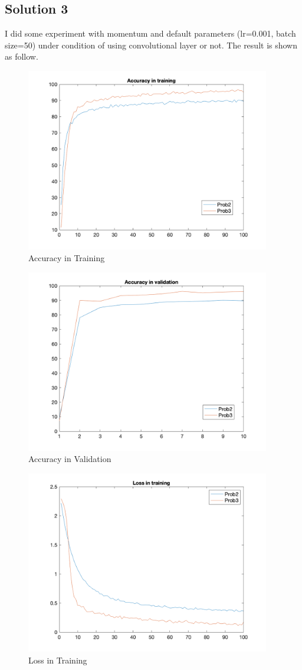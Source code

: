 \documentclass{article}
\newcommand{\solution}[1]{\clearpage \subsection*{Solution #1}}
\begin{document}
\solution{3} 
I did some experiment with momentum and default parameters (lr=0.001, batch size=50) under condition of using convolutional layer or not. The result is shown as follow.

\begin{figure}[!h]
  \centering
  \includegraphics[height=8cm]{plots/prob3at.png}
  \caption{Accuracy in Training}
\end{figure}
\begin{figure}[!h]
  \centering
  \includegraphics[height=8cm]{plots/prob3av.png}
  \caption{Accuracy in Validation}
\end{figure}
\begin{figure}[!h]
  \centering
  \includegraphics[height=8cm]{plots/prob3lt.png}
  \caption{Loss in Training}
\end{figure}
\end{document}
